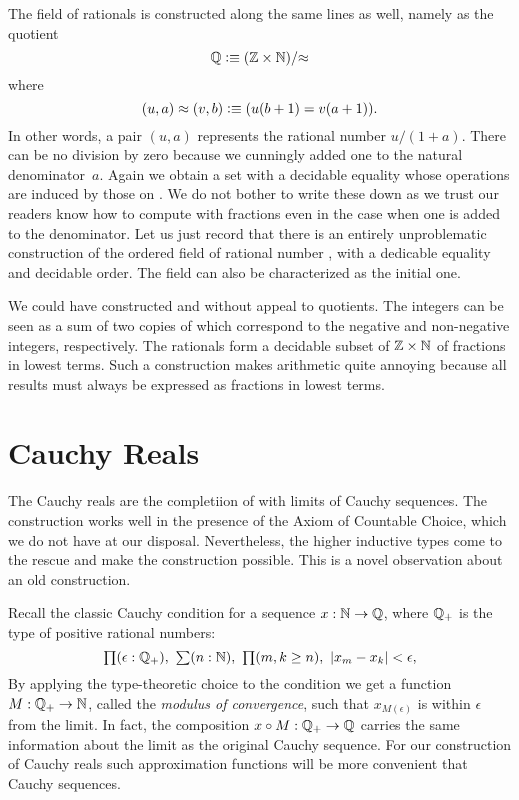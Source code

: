 The field of rationals \Q is constructed along the same lines as well, namely as the
quotient
%
\[ \mathbb{Q} \vcentcolon\equiv (\mathbb{Z} \times \mathbb{N})/{\approx} \]
%
where
\[ (u,a) \approx (v,b) \vcentcolon\equiv (u (b + 1) = v (a + 1)). \]
%
In other words, a pair $(u, a)$ represents the rational number $u / (1 + a)$. There can be
no division by zero because we cunningly added one to the natural denominator~$a$. Again
we obtain a set with a decidable equality whose operations are induced by those on \Z. We
do not bother to write these down as we trust our readers know how to compute with
fractions even in the case when one is added to the denominator. Let us just record that
there is an entirely unproblematic construction of the ordered field of rational number
\Q, with a dedicable equality and decidable order. The field \Q can also be characterized
as the initial one.

\begin{rmk}
  We could have constructed \Z and \Q without appeal to quotients. The integers can be
  seen as a sum of two copies of \N which correspond to the negative and non-negative
  integers, respectively. The rationals form a decidable subset of $\mathbb{Z} \times \mathbb{N}$ of
  fractions in lowest terms. Such a construction makes arithmetic quite annoying because
  all results must always be expressed as fractions in lowest terms.
\end{rmk}


\section{Cauchy Reals}
\label{sec:cauchy-reals}

The Cauchy reals are the completiion of \Q with limits of Cauchy sequences. The
construction works well in the presence of the Axiom of Countable Choice, which we do not
have at our disposal. Nevertheless, the higher inductive types come to the rescue and make
the construction possible. This is a novel observation about an old construction.

Recall the classic Cauchy condition for a sequence $x : \mathbb{N} \to \mathbb{Q}$, where $\mathbb{Q}_{+}$ is the
type of positive rational numbers:
%
\[ \prd{\epsilon : \Qp} \sm{n : \N} \prd{m, k \geq n} |x_m - x_k| < \epsilon, \]
%
By applying the type-theoretic choice to the condition we get a function $M : \mathbb{Q}_{+} \to \mathbb{N}$,
called the \emph{modulus of convergence}, such that $x_{M(\epsilon)}$ is within $\epsilon$
from the limit. In fact, the composition $x \circ M : \mathbb{Q}_{+} \to \mathbb{Q}$ carries the same
information about the limit as the original Cauchy sequence. For our construction of
Cauchy reals such approximation functions will be more convenient that Cauchy sequences.

